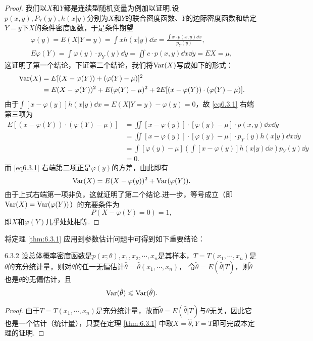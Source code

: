 \begin{proof}
  我们以$X$和$Y$都是连续型随机变量为例加以证明.设$p(x,y),P_Y(y),h(x|y)$分别为$X$和$Y$的联合密度函数、$Y$的边际密度函数和给定$Y=y$下$X$的条件密度函数，于是条件期望
  \begin{gather*}
    \varphi(y) = E(X|Y=y) = \int xh(x|y)\dd x = \frac{\int x\cdot p(x,y)\dd x}{p_Y(y)}, \\
    E\varphi(Y) = \int\varphi(y)\cdot p_Y(y)\dd y = \iint c\cdot p(x,y)\dd x\dd y = EX = \mu,
  \end{gather*}
  这证明了第一个结论，下证第二个结论，我们将$\operatorname{Var}(X)$写成如下的形式：
  \begin{equation}\label{eq6.3.1}
    \begin{aligned}
    \operatorname{Var}(X) & = E[ (X-\varphi(Y)) + (\varphi(Y) - \mu) ]^2 \\
    & = E(X-\varphi(Y))^2 + E(\varphi(Y)-\mu)^2 + 2 E[(x-\varphi(Y))\cdot (\varphi(Y) - \mu)].
    \end{aligned}
  \end{equation}
  由于$\int[x-\varphi(y)]h(x|y)\dd x= E(X|Y=y)-\varphi(y)=0$，故 \eqref{eq6.3.1} 右端第三项为
  \begin{align*}
    E[(x-\varphi(Y))\cdot (\varphi(Y) - \mu)] & = \iint[x-\varphi(y)]\cdot [\varphi(y)-\mu] \cdot p(x,y)\dd x\dd y \\
    & = \iint[x-\varphi(y)]\cdot [\varphi(y)-\mu] \cdot p_Y(y)h(x|y)\dd x\dd y \\
    & = \int[\varphi(y)-\mu]\left( \int[x-\varphi(y)]h(x|y)\dd x\right)p_Y(y)\dd y \\
    & = 0.
  \end{align*}
  而 \eqref{eq6.3.1} 右端第二项正是$\varphi(y)$的方差，由此即有
  \begin{equation}\label{eq6.3.2}
    \operatorname{Var}(X) = E(X-\varphi(y))^2 + \operatorname{Var}(\varphi(Y)).
  \end{equation}
  由于上式右端第一项非负，这就证明了第二个结论.进一步，等号成立（即$\operatorname{Var}(X)=\operatorname{Var}(\varphi(Y))$）的充要条件为
  \begin{equation}\label{eq6.3.3}
    P(X - \varphi(Y)=0) = 1,
  \end{equation}
  即$X$和$\varphi(Y)$几乎处处相等.
\end{proof}

将定理 \ref{thm:6.3.1} 应用到参数估计问题中可得到如下重要结论：
\begin{theorem}{}{6.3.2}
  设总体概率密度函数是$p(x;\theta),x_1,x_2,\cdots,x_n$是其样本，$T=T(x_1,\cdots,x_n)$是$\theta$的充分统计量，则对$\theta$的任一无偏估计$\hat\theta=\hat\theta(x_1,\cdots,x_n)$，
  令$\tilde\theta=E(\hat\theta|T)$，则$\tilde\theta$也是$\theta$的无偏估计，且
  \begin{equation}\label{eq6.3.4}
    \operatorname{Var}(\tilde\theta) \leqslant \operatorname{Var}(\hat\theta).
  \end{equation}
\end{theorem}
\begin{proof}
  由于$T=T(x_1,\cdots,x_n)$是充分统计量，故而$\tilde\theta=E(\hat\theta|T)$与$\theta$无关，因此它也是一个估计（统计量），只要在定理 \ref{thm:6.3.1} 中取$X=\hat\theta,Y=T$即可完成本定理的证明.
\end{proof}

